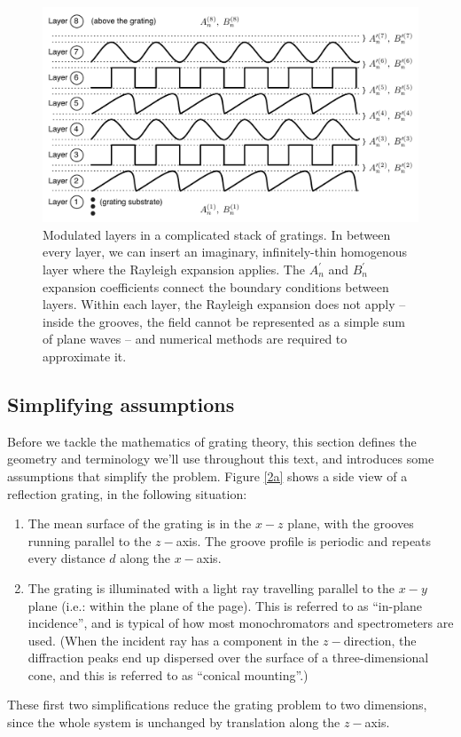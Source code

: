 \begin{figure}[htbp] %
   \centering
   \includegraphics[scale=0.5]{../data/Chapter2/2d_stacksOfGratings/2d_2.pdf} 
   \caption{Modulated layers in a complicated stack of gratings.  In between every layer, we can insert an imaginary, infinitely-thin homogenous layer where the Rayleigh expansion applies.  The $A^{\prime}_n$ and $B^{\prime}_n$ expansion coefficients connect the boundary conditions between layers.  Within each layer, the Rayleigh expansion does not apply -- inside the grooves, the field cannot be represented as a simple sum of plane waves -- and numerical methods are required to approximate it.}
   \label{2d-2}
\end{figure}

\subsection{Simplifying assumptions}
\label{s_assumptions}
Before we tackle the mathematics of grating theory, this section defines the geometry and terminology we'll use throughout this text, and introduces some assumptions that simplify the problem.  Figure \ref{2a} shows a side view of a reflection grating, in the following situation:
\begin{enumerate}
\item The mean surface of the grating is in the $x-z$ plane, with the grooves running parallel to the $z-$axis.  The groove profile is periodic and repeats every distance $d$ along the $x-$axis.
\item The grating is illuminated with a light ray travelling parallel to the $x-y$ plane (i.e.: within the plane of the page). This is referred to as ``in-plane incidence'', and is typical of how most monochromators and spectrometers are used.  (When the incident ray has a component in the $z-$direction, the diffraction peaks end up dispersed over the surface of a three-dimensional cone, and this is referred to as ``conical mounting''.)
\end{enumerate}
These first two simplifications reduce the grating problem to two dimensions, since the whole system is unchanged by translation along the $z-$axis.

